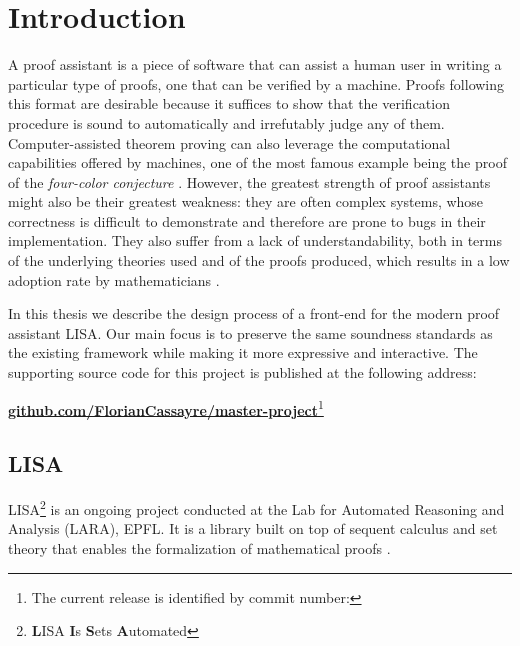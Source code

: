 \section{Introduction}
\label{sec:introduction}

A proof assistant is a piece of software that can assist a human user in writing a particular type of proofs, one that can be verified by a machine. Proofs following this format are desirable because it suffices to show that the verification procedure is sound to automatically and irrefutably judge any of them. Computer-assisted theorem proving can also leverage the computational capabilities offered by machines, one of the most famous example being the proof of the \textit{four-color conjecture} \cite{Appel1989}. However, the greatest strength of proof assistants might also be their greatest weakness: they are often complex systems, whose correctness is difficult to demonstrate and therefore are prone to bugs in their implementation. They also suffer from a lack of understandability, both in terms of the underlying theories used and of the proofs produced, which results in a low adoption rate by mathematicians \cite{Ayers2021}.

In this thesis we describe the design process of a front-end for the modern proof assistant LISA. Our main focus is to preserve the same soundness standards as the existing framework while making it more expressive and interactive. The supporting source code for this project is published at the following address:
\begin{center}
\href{http://github.com/FlorianCassayre/master-project}{\textbf{github.com/FlorianCassayre/master-project}}\footnote{The current release is identified by commit number: }
\end{center}

\subsection{LISA}

LISA\footnote{\textbf{L}ISA \textbf{I}s \textbf{S}ets \textbf{A}utomated} is an ongoing project conducted at the Lab for Automated Reasoning and Analysis (LARA), EPFL. It is a library built on top of sequent calculus and set theory that enables the formalization of mathematical proofs \cite{Guilloud2022-2}.

